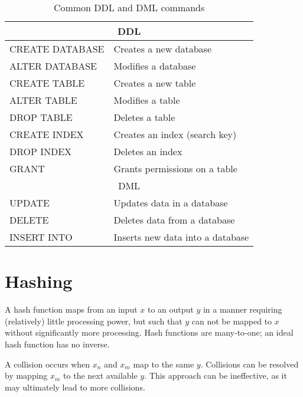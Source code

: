 \documentclass{article}
\begin{document}
\begin{table}

    \centering

    \begin{tabular}{ll}

        \toprule

        \multicolumn{2}{c}{DDL} \\

        \midrule

        CREATE DATABASE & Creates a new database \\
        
        ALTER DATABASE  & Modifies a database \\
        
        CREATE TABLE    & Creates a new table \\
        
        ALTER TABLE     & Modifies a table \\

        DROP TABLE      & Deletes a table \\
        
        CREATE INDEX    & Creates an index (search key) \\
        
        DROP INDEX      & Deletes an index \\
        
        GRANT           & Grants permissions on a table \\

        \midrule

        \multicolumn{2}{c}{DML} \\

        \midrule
        
        UPDATE          & Updates data in a database \\
        
        DELETE          & Deletes data from a database \\
        
        INSERT INTO     & Inserts new data into a database \\

        \bottomrule

    \end{tabular}

    \caption{Common DDL and DML commands}

\end{table}

\section{Hashing}

A hash function maps from an input $x$ to an output $y$ in a manner requiring
(relatively) little processing power, but such that $y$ can not be mapped to $x$
without significantly more processing. Hash functions are many-to-one; an ideal
hash function has no inverse. 

A collision occurs when $x_n$ and $x_m$ map to the same $y$. Collisions can be
resolved by mapping $x_m$ to the next available $y$. This approach can be
ineffective, as it may ultimately lead to more collisions.
\end{document}
